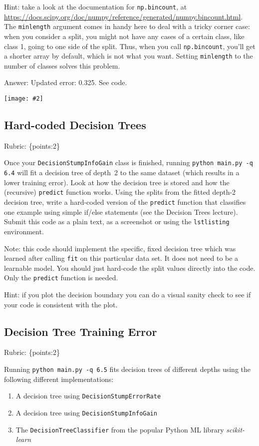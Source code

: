 \documentclass{article}
\def\ans#1{\par\gre{Answer: #1}}
\def\answer#1{\ans{#1}}
\def\rubric#1{\gre{Rubric: \{#1\}}}{}
\def\blu#1{{\color{blu}#1}}
\def\gre#1{{\color{gre}#1}}
\newcommand{\centerfig}[2]{\begin{center}\texttt{[image: \#2]}\end{center}}
\def\enum#1{\begin{enumerate}#1\end{enumerate}}
\begin{document}
	Hint: take a look at the documentation for \texttt{np.bincount}, at \\
	\url{https://docs.scipy.org/doc/numpy/reference/generated/numpy.bincount.html}. 
	The \texttt{minlength} argument comes in handy here to deal with a tricky corner case:
	when you consider a split, you might not have any cases of a certain class, like class 1,
	going to one side of the split. Thus, when you call \texttt{np.bincount}, you'll get
	a shorter array by default, which is not what you want. Setting \texttt{minlength} to the 
	number of classes solves this problem.
	
	
	\answer{
		Updated error: 0.325. See code.
		\centerfig{.7}{../figs/q6_3_decisionBoundary}
	}
	
	
	\subsection{Hard-coded Decision Trees}
	\rubric{points:2}
	
	Once your \texttt{DecisionStumpInfoGain} class is finished, running \texttt{python main.py -q 6.4} will fit
	a decision tree of depth~2 to the same dataset (which results in a lower training error).
	Look at how the decision tree is stored and how the (recursive) \texttt{predict} function works.
	\blu{Using the splits from the fitted depth-2 decision tree, write a hard-coded version of the \texttt{predict}
		function that classifies one example using simple if/else statements
		(see the Decision Trees lecture). Submit this code as a plain text, as a screenshot or using the \texttt{lstlisting} environment.}
	
	Note: this code should implement the specific, fixed decision tree
	which was learned after calling \texttt{fit} on this particular data set. It does not need to be a learnable model.
	You should just hard-code the split values directly into the code.
	Only the \texttt{predict} function is needed.
	
	Hint: if you plot the decision boundary you can do a visual sanity check to see if your code is consistent with the plot.
	
	
	
	
	
	\subsection{Decision Tree Training Error}
	\rubric{points:2}
	
	Running \texttt{python main.py -q 6.5} fits decision trees of different depths using the following different implementations: 
	\enum{
		\item A decision tree using \texttt{DecisionStumpErrorRate}
		\item A decision tree using \texttt{DecisionStumpInfoGain}
		\item The \texttt{DecisionTreeClassifier} from the popular Python ML library \emph{scikit-learn}
	}
	
\end{document}
